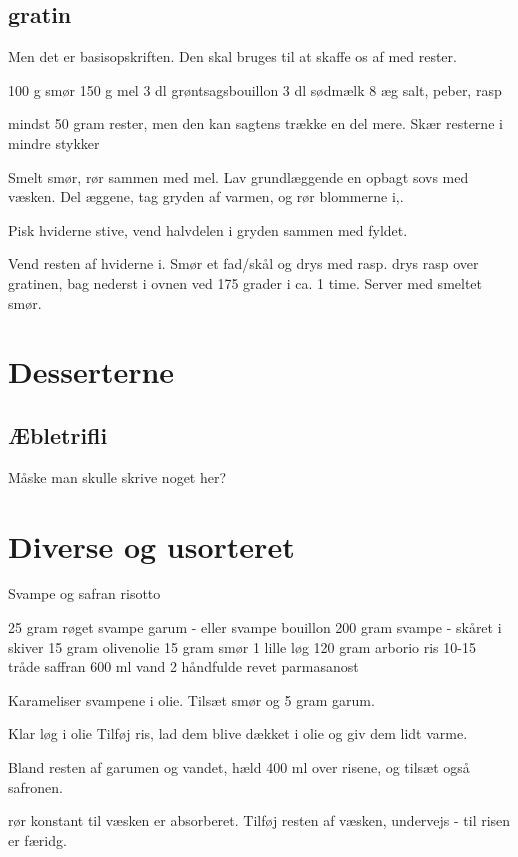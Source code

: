 \documentclass[
]{book}
\begin{document}
\section{gratin}\label{gratin}

Men det er basisopskriften. Den skal bruges til at skaffe os af med rester.

100 g smør
150 g mel
3 dl grøntsagsbouillon
3 dl sødmælk
8 æg
salt, peber, rasp

mindst 50 gram rester, men den kan sagtens trække en del mere.
Skær resterne i mindre stykker

Smelt smør, rør sammen med mel. Lav grundlæggende en opbagt
sovs med væsken.
Del æggene, tag gryden af varmen, og rør blommerne i,.

Pisk hviderne stive, vend halvdelen i gryden sammen med fyldet.

Vend resten af hviderne i. Smør et fad/skål
og drys med rasp. drys rasp over gratinen, bag nederst i ovnen
ved 175 grader i ca. 1 time. Server med smeltet smør.

\chapter{Desserterne}\label{desserterne}

\section{Æbletrifli}\label{uxe6bletrifli}

Måske man skulle skrive noget her?

\chapter{Diverse og usorteret}\label{diverse-og-usorteret}

Svampe og safran risotto

25 gram røget svampe garum - eller svampe bouillon
200 gram svampe - skåret i skiver
15 gram olivenolie
15 gram smør
1 lille løg
120 gram arborio ris
10-15 tråde saffran
600 ml vand
2 håndfulde revet parmasanost

Karameliser svampene i olie.
Tilsæt smør og 5 gram garum.

Klar løg i olie
Tilføj ris, lad dem blive dækket i olie og giv dem lidt varme.

Bland resten af garumen og vandet, hæld 400 ml over risene, og
tilsæt også safronen.

rør konstant til væsken er absorberet. Tilføj resten af
væsken, undervejs - til risen er færidg.
\end{document}
